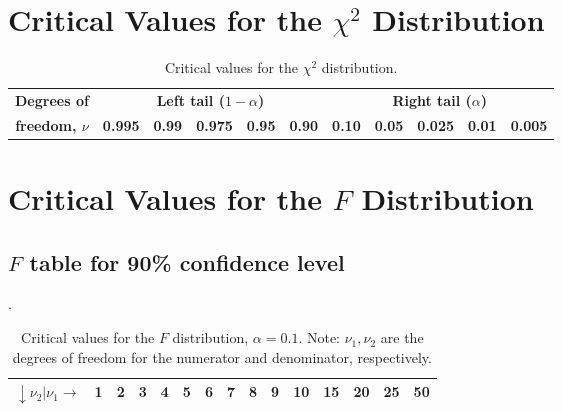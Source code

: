 \clearpage
\section{Critical Values for the $\chi^2$ Distribution}
\begin{table}[H]
\centering
\begin{tabular}{|c|ccccc||ccccc|} \hline
\bf{Degrees of} &  \multicolumn{5}{|c||}{\bf{Left tail} ($1-\alpha$)}  & \multicolumn{5}{c|}{\bf{Right tail} ($\alpha$)} \\  \cline{2-11}
\bf{freedom, }$\nu$ &  \bf{0.995}  & \bf{0.99} & \bf{0.975} & \bf{0.95}  & \bf{0.90} &  \bf{0.10}  & \bf{0.05} & \bf{0.025} & \bf{0.01}  & \bf{0.005} \\ \hline

\end{tabular}
\caption{Critical values for the $\chi^2$ distribution.}
\label{tbl:Critical_chi2}
\end{table}

\clearpage
\section{Critical Values for the $F$ Distribution}
\label{sec:Ftables}

\subsection{$F$ table for 90\% confidence level}.

\begin{table}[h]
\centering
\footnotesize
\begin{tabular}{|c|cccccccccccccc|} \hline
$\downarrow \nu_2 | \nu_1 \rightarrow$ & \bf{1} & \bf{2} & \bf{3} & \bf{4} & \bf{5} & \bf{6} & \bf{7} & \bf{8} & \bf{9} & \bf{10} & \bf{15} & \bf{20} & \bf{25} & \bf{50} \\ \hline

\end{tabular}
\normalsize
\caption{Critical values for the $F$ distribution, $\alpha = 0.1$.  Note: $\nu_1, \nu_2$ are the degrees of freedom for
the numerator and denominator, respectively.}
\label{tbl:Critical_F90}
\end{table}

